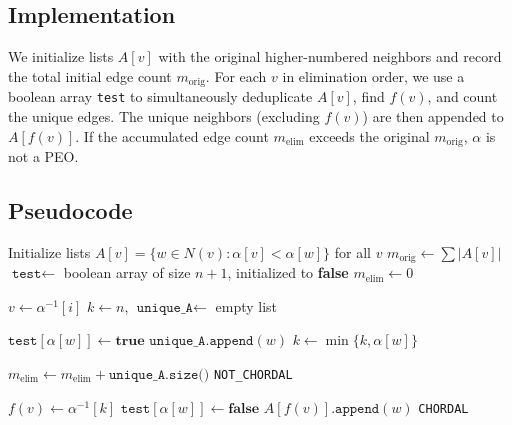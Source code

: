 \subsection{Implementation}
We initialize lists $A[v]$ with the original higher-numbered neighbors and record the total initial edge count $m_{\text{orig}}$. For each $v$ in elimination order, we use a boolean array \texttt{test} to simultaneously deduplicate $A[v]$, find $f(v)$, and count the unique edges. The unique neighbors (excluding $f(v)$) are then appended to $A[f(v)]$. If the accumulated edge count $m_{\text{elim}}$ exceeds the original $m_{\text{orig}}$, $\alpha$ is not a PEO.

\subsection{Pseudocode}

\begin{algorithm}[H]
\caption{Zero Fill-In Test (\texttt{FILL})}
\begin{algorithmic}[1]
    \State Initialize lists $A[v] = \{w \in N(v) : \alpha[v] < \alpha[w]\}$ for all $v$
    \State $m_{\text{orig}} \gets \sum |A[v]|$
    \State $\texttt{test} \gets$ boolean array of size $n+1$, initialized to \textbf{false}
    \State $m_{\text{elim}} \gets 0$
    
        \State $v \gets \alpha^{-1}[i]$
        \State $k \gets n$, $\texttt{unique\_A} \gets$ empty list
        
                \State $\texttt{test}[\alpha[w]] \gets \textbf{true}$
                \State $\texttt{unique\_A}.\texttt{append}(w)$
                \State $k \gets \min\{k, \alpha[w]\}$
            \EndIf
        \EndFor
        
        \State $m_{\text{elim}} \gets m_{\text{elim}} + \texttt{unique\_A.size()}$
         \Return \texttt{NOT\_CHORDAL} \EndIf
        
        \State $f(v) \gets \alpha^{-1}[k]$
            \State $\texttt{test}[\alpha[w]] \gets \textbf{false}$
             $A[f(v)].\texttt{append}(w)$ \EndIf
        \EndFor
    \EndFor
    \State \Return \texttt{CHORDAL}
\EndFunction
\end{algorithmic}
\end{algorithm}


